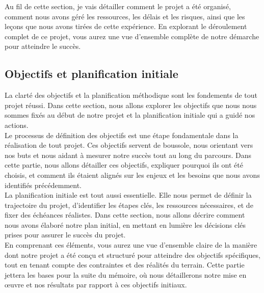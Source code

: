 \documentclass[a4paper, 12pt, french]{article}
\begin{document}
			Au fil de cette section, je vais détailler comment le projet a été organisé, comment nous avons géré les ressources, les délais et les risques, ainsi que les leçons que nous avons tirées de cette expérience. En explorant le déroulement complet de ce projet, vous aurez une vue d'ensemble complète de notre démarche pour atteindre le succès.


			\subsection{Objectifs et planification initiale}

				La clarté des objectifs et la planification méthodique sont les fondements de tout projet réussi. Dans cette section, nous allons explorer les objectifs que nous nous sommes fixés au début de notre projet et la planification initiale qui a guidé nos actions.\\

				Le processus de définition des objectifs est une étape fondamentale dans la réalisation de tout projet. Ces objectifs servent de boussole, nous orientant vers nos buts et nous aidant à mesurer notre succès tout au long du parcours. Dans cette partie, nous allons détailler ces objectifs, expliquer pourquoi ils ont été choisis, et comment ils étaient alignés sur les enjeux et les besoins que nous avons identifiés précédemment.\\

				La planification initiale est tout aussi essentielle. Elle nous permet de définir la trajectoire du projet, d'identifier les étapes clés, les ressources nécessaires, et de fixer des échéances réalistes. Dans cette section, nous allons décrire comment nous avons élaboré notre plan initial, en mettant en lumière les décisions clés prises pour assurer le succès du projet.\\

				En comprenant ces éléments, vous aurez une vue d'ensemble claire de la manière dont notre projet a été conçu et structuré pour atteindre des objectifs spécifiques, tout en tenant compte des contraintes et des réalités du terrain. Cette partie jettera les bases pour la suite du mémoire, où nous détaillerons notre mise en œuvre et nos résultats par rapport à ces objectifs initiaux.
\end{document}
